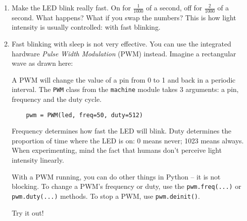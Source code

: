 \documentclass[a4paper,10pt]{article}
\begin{document}
\begin{enumerate}[resume]

\item Make the LED blink really fast.
      On for $\frac{1}{1000}$ of a second, off for $\frac{2}{1000}$ of a second.
      What happens? What if you swap the numbers?
      This is how light intensity is usually controlled: with fast blinking.

\item Fast blinking with sleep is not very effective.
      You can use the integrated hardware \emph{Pulse Width Modulation} (PWM) instead.
      Imagine a rectangular wave as drawn here:

      \begin{center}
      \end{center}

      A PWM will change the value of a pin from 0 to 1 and back in a periodic interval.
      The \texttt{PWM} class from the \texttt{machine} module takes 3 arguments:
      a pin, frequency and the duty cycle.

      \texttt{~~~~pwm = PWM(led, freq=50, duty=512)}

      Frequency determines how fast the LED will blink.
      Duty determines the proportion of time where the LED is on: 0 means never;
      1023 means always.
      When experimenting, mind the fact that humans don't perceive light intensity linearly.

      With a PWM running, you can do other things in Python -- it is not blocking.
      To change a PWM's frequency or duty, use the \texttt{pwm.freq(...)} or \texttt{pwm.duty(...)} methods.
      To stop a PWM, use \texttt{pwm.deinit()}.

      Try it out!

\end{enumerate}
\end{document}
